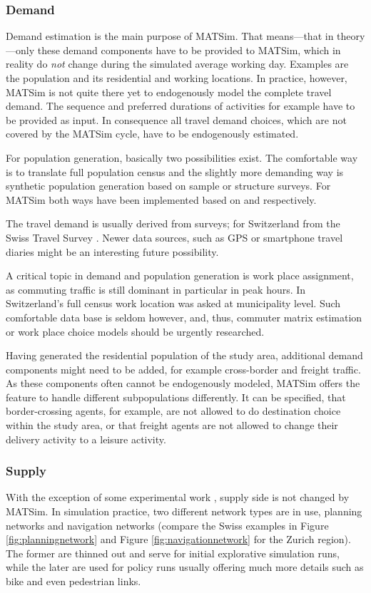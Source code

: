 \subsubsection{Demand}
Demand estimation is the main purpose of MATSim. That means---that in theory---only these demand components have to be provided to MATSim, which in reality do \emph{not} change during the simulated average working day. Examples are the population and its residential and working locations. In practice, however, MATSim is not quite there yet to endogenously model the complete travel demand. The sequence and preferred durations of activities for example have to be provided as input. In consequence all travel demand choices, which are not covered by the MATSim cycle, have to be endogenously estimated. 

For population generation, basically two possibilities exist. The comfortable way is to translate full population census and the slightly more demanding way is synthetic population generation \citep[e.g.,][]{} based on sample or structure surveys. For MATSim both ways have been implemented based on \citet[][]{BfS_VZ_2000} and \citet[][]{Mueller_unpub_STRC_2011} respectively.

The travel demand is usually derived from surveys; for Switzerland from the Swiss Travel Survey \citep[][]{BfS-MZ2005_manual_2006}. Newer data sources, such as GPS or smartphone travel diaries might be an interesting future possibility.

A critical topic in demand and population generation is work place assignment, as commuting traffic is still dominant in particular in peak hours. In Switzerland's full census work location was asked at municipality level. Such comfortable data base is seldom however, and, thus, commuter matrix estimation or work place choice models should be urgently researched.

Having generated the residential population of the study area, additional demand components might need to be added, for example cross-border and freight traffic. As these components often cannot be endogenously modeled, MATSim offers the feature to handle different subpopulations differently. It can be specified, that border-crossing agents, for example, are not allowed to do destination choice within the study area, or that freight agents are not allowed to change their delivery activity to a leisure activity.

\subsubsection{Supply}
With the exception of some experimental work \citep[][]{HorniEtAl_TechRep_IVT_2012}, supply side is not changed by MATSim. In simulation practice, two different network types are in use, planning networks and navigation networks (compare the Swiss examples in Figure \ref{fig:planningnetwork} and Figure \ref{fig:navigationnetwork} for the Zurich region). The former are thinned out and serve for initial explorative simulation runs, while the later are used for policy runs usually offering much more details such as bike and even pedestrian links.

